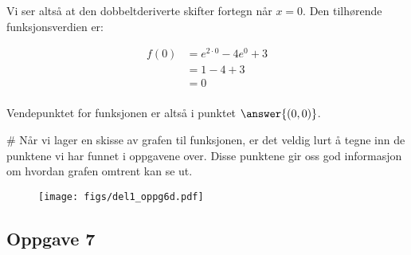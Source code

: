\begin{easylist}[enumerate]
	Vi ser altså at den dobbeltderiverte skifter fortegn når $x=0$. Den tilhørende funksjonsverdien er: 
	
	\begin{equation*}
	\begin{aligned}
	f(0) & = e^{2 \cdot 0} - 4e^0 + 3\\
	& = 1 -4 +3\\
	& = 0\\
	\end{aligned}
	\end{equation*}	
	
	Vendepunktet for funksjonen er altså i punktet $\answer{(0,0)}$.
	
	# Når vi lager en skisse av grafen til funksjonen, er det veldig lurt å tegne inn de punktene vi har funnet i oppgavene over. Disse punktene gir oss god informasjon om hvordan grafen omtrent kan se ut. 
	
	\begin{figure}[ht!]
		\centering
		\texttt{[image: figs/del1\_oppg6d.pdf]}
		\label{fig:del1_oppg6d}
	\end{figure}
	
\end{easylist}

\subsection*{Oppgave 7}

